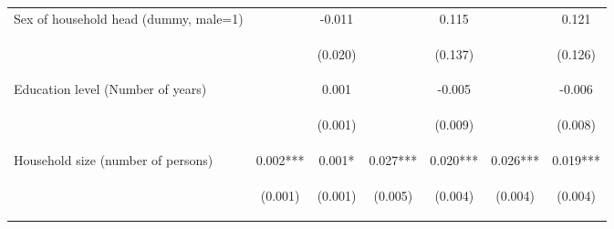 \begin{center}
\begin{tabular}{lcccccc}
Sex of household head (dummy, male=1) &  & -0.011 &  & 0.115 &  & 0.121 \\
\vspace{4pt} & \begin{footnotesize}\end{footnotesize} & \begin{footnotesize}(0.020)\end{footnotesize} & \begin{footnotesize}\end{footnotesize} & \begin{footnotesize}(0.137)\end{footnotesize} & \begin{footnotesize}\end{footnotesize} & \begin{footnotesize}(0.126)\end{footnotesize} \\
Education level (Number of years) &  & 0.001 &  & -0.005 &  & -0.006 \\
\vspace{4pt} & \begin{footnotesize}\end{footnotesize} & \begin{footnotesize}(0.001)\end{footnotesize} & \begin{footnotesize}\end{footnotesize} & \begin{footnotesize}(0.009)\end{footnotesize} & \begin{footnotesize}\end{footnotesize} & \begin{footnotesize}(0.008)\end{footnotesize} \\
Household size (number of persons) & 0.002*** & 0.001* & 0.027*** & 0.020*** & 0.026*** & 0.019*** \\
\vspace{4pt} & \begin{footnotesize}(0.001)\end{footnotesize} & \begin{footnotesize}(0.001)\end{footnotesize} & \begin{footnotesize}(0.005)\end{footnotesize} & \begin{footnotesize}(0.004)\end{footnotesize} & \begin{footnotesize}(0.004)\end{footnotesize} & \begin{footnotesize}(0.004)\end{footnotesize} \\

\end{tabular}
\end{center}
